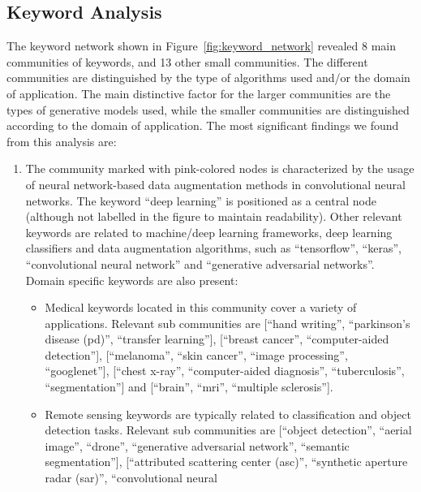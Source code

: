\documentclass[parskip=full]{scrartcl}
\begin{document}
\subsection{Keyword Analysis}

The keyword network shown in Figure~\ref{fig:keyword_network} revealed 8 main
communities of keywords, and 13 other small communities. The different
communities are distinguished by the type of algorithms used and/or the domain
of application. The main distinctive factor for the larger communities are the
types of generative models used, while the smaller communities are
distinguished according to the domain of application. The most significant
findings we found from this analysis are:

\begin{enumerate}
    \item The community marked with pink-colored nodes is characterized by the
        usage of neural network-based data augmentation methods in
        convolutional neural networks. The keyword ``deep learning'' is
        positioned as a central node (although not labelled in the figure to
        maintain readability). Other relevant keywords are related to
        machine/deep learning frameworks, deep learning classifiers and data
        augmentation algorithms, such as ``tensorflow'', ``keras'',
        ``convolutional neural network'' and ``generative adversarial
        networks''. Domain specific keywords are also present:
        \begin{itemize}
            \item Medical keywords located in this community cover a variety
                of applications. Relevant sub communities are [``hand
                writing'', ``parkinson's disease (pd)'', ``transfer
                learning''], [``breast cancer'', ``computer-aided
                detection''], [``melanoma'', ``skin cancer'', ``image
                processing'', ``googlenet''], [``chest x-ray'',
                ``computer-aided diagnosis'', ``tuberculosis'',
                ``segmentation''] and [``brain'', ``mri'', ``multiple
                sclerosis'']. 
            \item Remote sensing keywords are typically related to
                classification and object detection tasks. Relevant sub
                communities are [``object detection'', ``aerial image'',
                ``drone'', ``generative adversarial network'', ``semantic
                segmentation''], [``attributed scattering center (asc)'',
                ``synthetic aperture radar (sar)'', ``convolutional neural

\end{itemize}
\end{enumerate}
\end{document}
